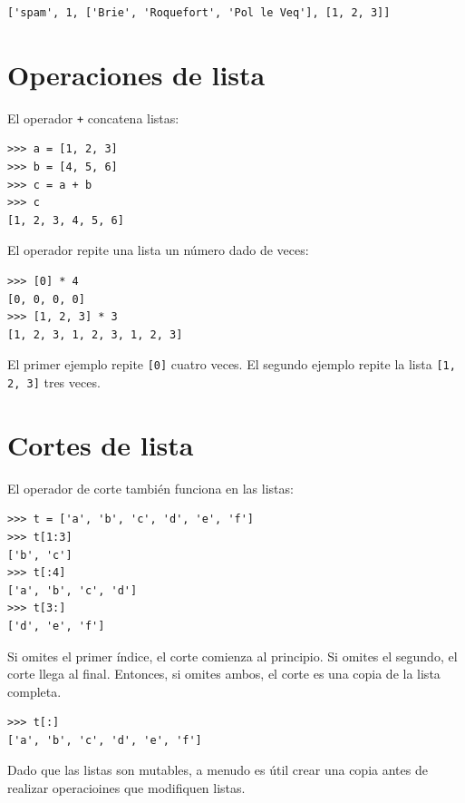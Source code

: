 \documentclass[10pt]{book}
\begin{document}
\begin{verbatim}
['spam', 1, ['Brie', 'Roquefort', 'Pol le Veq'], [1, 2, 3]]
\end{verbatim}



\section{Operaciones de lista}

El operador {\tt +} concatena listas:

\begin{verbatim}
>>> a = [1, 2, 3]
>>> b = [4, 5, 6]
>>> c = a + b
>>> c
[1, 2, 3, 4, 5, 6]
\end{verbatim}
%
El operador {\tt *} repite una lista un número dado de veces:

\begin{verbatim}
>>> [0] * 4
[0, 0, 0, 0]
>>> [1, 2, 3] * 3
[1, 2, 3, 1, 2, 3, 1, 2, 3]
\end{verbatim}
%
El primer ejemplo repite {\tt [0]} cuatro veces.  El segundo ejemplo
repite la lista {\tt [1, 2, 3]} tres veces.


\section{Cortes de lista}

El operador de corte también funciona en las listas:

\begin{verbatim}
>>> t = ['a', 'b', 'c', 'd', 'e', 'f']
>>> t[1:3]
['b', 'c']
>>> t[:4]
['a', 'b', 'c', 'd']
>>> t[3:]
['d', 'e', 'f']
\end{verbatim}
%
Si omites el primer índice, el corte comienza al principio.
Si omites el segundo, el corte llega al final.  Entonces, si
omites ambos, el corte es una copia de la lista completa.

\begin{verbatim}
>>> t[:]
['a', 'b', 'c', 'd', 'e', 'f']
\end{verbatim}
%
Dado que las listas son mutables, a menudo es útil crear una copia
antes de realizar operacioines que modifiquen listas.
\end{document}
